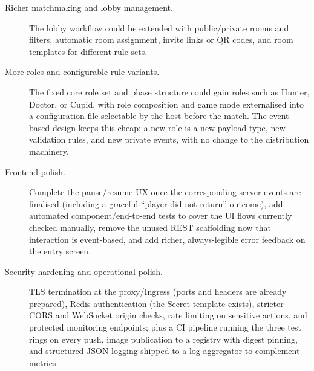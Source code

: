 \documentclass{scrartcl}
\begin{document}
\begin{description}
      \item[Richer matchmaking and lobby management.] The lobby workflow could be
            extended with public/private rooms and filters, automatic room assignment,
            invite links or QR codes, and room templates for different rule sets.

      \item[More roles and configurable rule variants.] The fixed core role set and
            phase structure could gain roles such as Hunter, Doctor, or Cupid, with role
            composition and game mode externalised into a configuration file selectable by
            the host before the match. The event-based design keeps this cheap: a new role
            is a new payload type, new validation rules, and new private events, with no
            change to the distribution machinery.

      \item[Frontend polish.] Complete the pause/resume UX once the corresponding
            server events are finalised (including a graceful ``player did not return''
            outcome), add automated component/end-to-end tests to cover the UI flows
            currently checked manually, remove the unused REST scaffolding now that
            interaction is event-based, and add richer, always-legible error feedback on the
            entry screen.

      \item[Security hardening and operational polish.] TLS termination at the
            proxy/Ingress (ports and headers are already prepared), Redis authentication
            (the Secret template exists), stricter CORS and WebSocket origin checks, rate
            limiting on sensitive actions, and protected monitoring endpoints; plus a CI
            pipeline running the three test rings on every push, image publication to a
            registry with digest pinning, and structured JSON logging shipped to a log
            aggregator to complement metrics.
\end{description}



\end{document}
